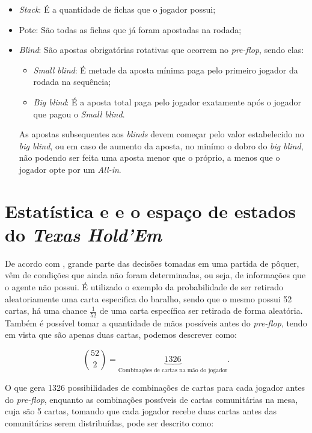 \begin{itemize}
      \item \textit{Stack}:
            É a quantidade de fichas que o jogador possui;
      \item Pote:
            São todas as fichas que já foram apostadas na rodada;
      \item \textit{Blind}:
            São apostas obrigatórias rotativas que ocorrem no \textit{pre-flop}, sendo elas:
            \begin{itemize}
                  \item \textit{Small blind}:
                        É metade da aposta mínima paga pelo primeiro jogador da rodada na sequência;
                  \item \textit{Big blind}:
                        É a aposta total paga pelo jogador exatamente após o jogador que pagou o \textit{Small blind}.
            \end{itemize}
            As apostas subsequentes aos \textit{blinds} devem começar pelo valor estabelecido no \textit{big blind}, ou em caso de aumento da aposta, no minímo o dobro do \textit{big blind}, não podendo ser feita uma aposta menor que o próprio, a menos que o jogador opte por um \textit{All-in}.
\end{itemize}

\section{Estatística e e o espaço de estados do \textit{Texas Hold'Em}}

De acordo com , grande parte das decisões tomadas em uma partida de pôquer, vêm de condições que ainda não foram determinadas, ou seja, de informações que o agente não possui.
É utilizado o exemplo da probabilidade de ser retirado aleatoriamente uma carta especifica do baralho, sendo que o mesmo possui 52 cartas, há uma chance $\frac{1}{52}$ de uma carta específica ser retirada de forma aleatória.
Também é possível tomar a quantidade de mãos possíveis antes do \textit{pre-flop}, tendo em vista que são apenas duas cartas, podemos descrever como:

$$\binom{52}{2} = \underbrace{1326}_\text{Combinações de cartas na mão do jogador}.$$

O que gera 1326 possibilidades de combinações de cartas para cada jogador antes do \textit{pre-flop}, enquanto as combinações possíveis de cartas comunitárias na mesa, cuja são 5 cartas, tomando que cada jogador recebe duas cartas antes das comunitárias serem distribuídas, pode ser descrito como:

